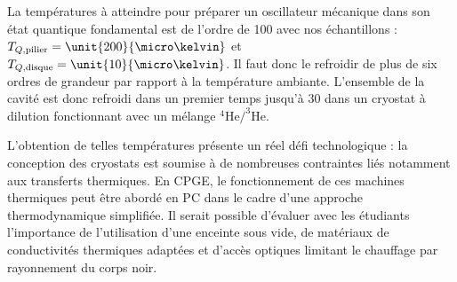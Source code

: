 \documentclass[12pt,a4paper]{article}
\newenvironment{mep}{%
\addcontentsline{ldf}{figure}{0}%
\begin{mep_env}
\small}
{\end{mep_env}}
\begin{document}
La températures à atteindre pour préparer un oscillateur mécanique dans son état quantique fondamental est de l'ordre de \unit{100}{\micro\kelvin} avec nos échantillons : $T_{Q,\mathrm{pilier}} = \unit{200}{\micro\kelvin}$ et $T_{Q,\mathrm{disque}} = \unit{10}{\micro\kelvin}$.
Il faut donc le refroidir de plus de six ordres de grandeur par rapport à la température ambiante.
L'ensemble de la cavité est donc refroidi dans un premier temps jusqu'à \unit{30}{\milli\kelvin} dans un cryostat à dilution fonctionnant avec un mélange $\mathrm{^4He/^3He}$.

\begin{mep}
L'obtention de telles températures présente un réel défi technologique : la conception des cryostats est soumise à de nombreuses contraintes liés notamment aux transferts thermiques.
En CPGE, le fonctionnement de ces machines thermiques peut être abordé en PC dans le cadre d'une approche thermodynamique simplifiée.
Il serait possible d'évaluer avec les étudiants l'importance de l'utilisation d'une enceinte sous vide, de matériaux de conductivités thermiques adaptées et d'accès optiques limitant le chauffage par rayonnement du corps noir.
\end{mep}
\end{document}
